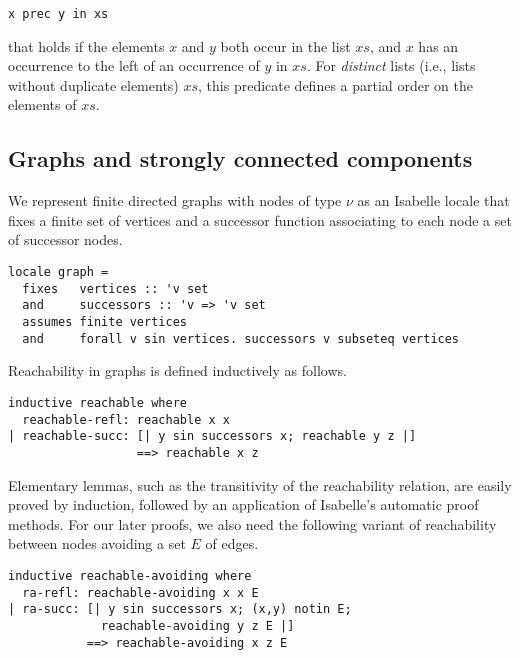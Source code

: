 \documentclass[sigplan,10pt,anonymous,review]{acmart}
\newcommand{\prog}[1]{\textit{#1}}
\begin{document}
\begin{small}
\begin{lstlisting}[language=isabelle]
  x prec y in xs
\end{lstlisting}
\end{small}
%
that holds if the elements $x$ and $y$ both occur in the list $xs$, and $x$ has an occurrence to the left of an occurrence of $y$ in $xs$. For \prog{distinct} lists (i.e., lists without duplicate elements) $xs$, this predicate defines a partial order on the elements of $xs$.


\subsection{Graphs and strongly connected components}
\label{sec:graphs}

We represent finite directed graphs with nodes of type $\nu$ as an Isabelle locale that fixes a finite set of vertices and a successor function associating to each node a set of successor nodes.

\begin{small}
\begin{lstlisting}[language=isabelle]
locale graph =
  fixes   vertices :: 'v set
  and     successors :: 'v => 'v set
  assumes finite vertices  
  and     forall v sin vertices. successors v subseteq vertices
\end{lstlisting}
\end{small}

Reachability in graphs is defined inductively as follows.

\begin{small}
\begin{lstlisting}[language=isabelle]
inductive reachable where
  reachable-refl: reachable x x
| reachable-succ: [| y sin successors x; reachable y z |]
                  ==> reachable x z
\end{lstlisting}
\end{small}

Elementary lemmas, such as the transitivity of the reachability relation, are easily proved by induction, followed by an application of Isabelle's automatic proof methods. For our later proofs, we also need the following variant of reachability between nodes avoiding a set $E$ of edges.

\begin{small}
\begin{lstlisting}[language=isabelle]
inductive reachable-avoiding where
  ra-refl: reachable-avoiding x x E
| ra-succ: [| y sin successors x; (x,y) notin E; 
             reachable-avoiding y z E |] 
           ==> reachable-avoiding x z E
\end{lstlisting}
\end{small}
\end{document}
